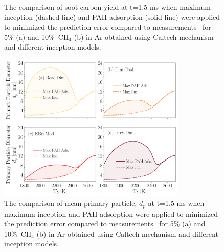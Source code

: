 \begin{figure}[H]
	\centering
	\caption{The comparison of soot carbon yield at t=1.5 ms when maximum inception (dashed line) and PAH adsorption (solid line) were applied to minimized the prediction error compared to measurements~\citep{agafonov2016unified} for 5\% (a) and 10\%~$\mathrm{CH_4}$ (b) in Ar obtained using Caltech mechanism and different inception models.}
	\label{fig:shockagof_yield_maxincads_cpr} 
\end{figure}

\begin{figure}[H]
	\centering
	\includegraphics[width=0.8\textwidth]{Figures/Results/Shocktube/Agafonov2016_cpr/d_p_maxincads.pdf}
	\caption{The comparison of mean primary particle, $d_p$ at t=1.5 ms when maximum inception and PAH adsorption were applied to minimized the prediction  error compared to measurements~\citep{agafonov2016unified} for 5\% (a) and 10\%~$\mathrm{CH_4}$ (b) in Ar obtained using Caltech mechanism and different inception models.}
	\label{fig:shockagof_dp_maxincads_cpr} 
\end{figure}

